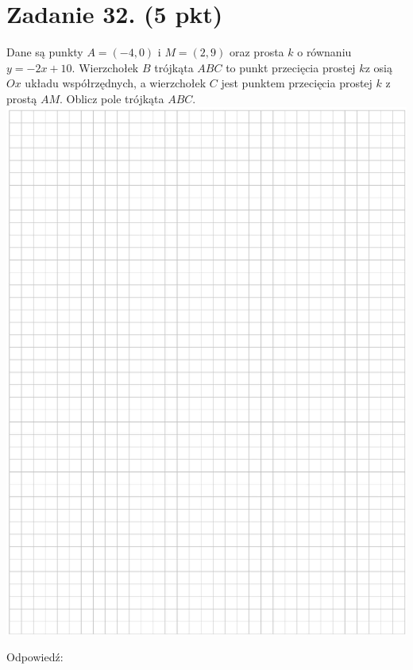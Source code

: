 \documentclass[10pt]{article}
\begin{document}
\section*{Zadanie 32. (5 pkt)}
Dane są punkty \(A=(-4,0)\) i \(M=(2,9)\) oraz prosta \(k\) o równaniu \(y=-2 x+10\). Wierzchołek \(B\) trójkąta \(A B C\) to punkt przecięcia prostej \(k \mathrm{z}\) osią \(O x\) układu współrzędnych, a wierzchołek \(C\) jest punktem przecięcia prostej \(k\) z prostą \(A M\). Oblicz pole trójkąta \(A B C\).\\
\includegraphics[max width=\textwidth, center]{2024_11_21_ad8c43efe74fa059d24eg-22}

Odpowiedź:
\end{document}
